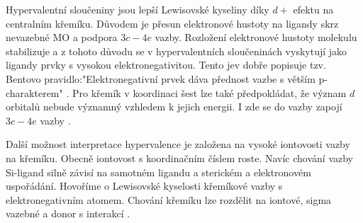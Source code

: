 \documentclass[
  digital, %
  table,   %
  lof,     %
  lot,     %
  oneside,
]{fithesis3}
\begin{document}
Hypervalentní sloučeniny jsou lepší Lewisovské kyseliny díky $d+$ efektu na centralním křemíku. Důvodem je přesun elektronové hustoty na ligandy skrz nevazebné MO a podpora $3c-4e$ vazby. Rozložení elektronové hustoty molekulu stabilizuje a z tohoto důvodu se v hypervalentních sloučeninách vyskytují jako ligandy prvky s vysokou elektronegativitou. Tento jev dobře popisuje tzv. Bentovo pravidlo:"Elektronegativní prvek dáva přednost vazbe s větším p-charakterem" \cite{hypervalentsiliconmacmillangroup2005}. Pro křemík v koordinaci šest lze také předpokládat, že význam $d$ orbitalů nebude významný vzhledem k jejich energii. I zde se do vazby zapojí $3c-4e$ vazby \cite{Wagler2014}.

Další možnost interpretace hypervalence je založena na vysoké iontovosti vazby na křemíku. Obecně iontovost s koordinačním číslem roste.
Navíc chování vazby Si-ligand silně závisí na samotném ligandu a sterickém a elektronovém uspořádání. Hovoříme o Lewisovské kyselosti křemíkové vazby s elektronegativním atomem. Chování křemíku lze rozdělit na iontové, sigma vazebné a donor s interakcí \cite{Wagler2014}.\\
\end{document}
